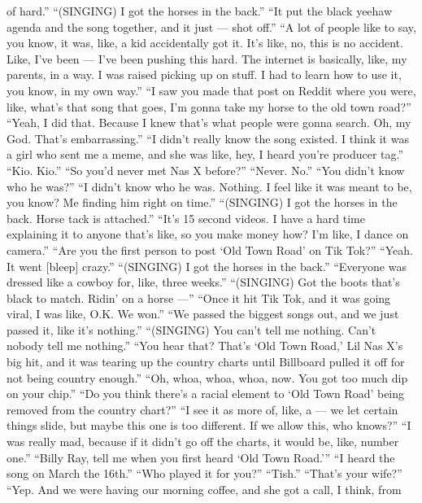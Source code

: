 \begin{itemize}
  of hard.'' ``(SINGING) I got the horses in the back.'' ``It put the
  black yeehaw agenda and the song together, and it just --- shot off.''
  ``A lot of people like to say, you know, it was, like, a kid
  accidentally got it. It's like, no, this is no accident. Like, I've
  been --- I've been pushing this hard. The internet is basically, like,
  my parents, in a way. I was raised picking up on stuff. I had to learn
  how to use it, you know, in my own way.'' ``I saw you made that post
  on Reddit where you were, like, what's that song that goes, I'm gonna
  take my horse to the old town road?'' ``Yeah, I did that. Because I
  knew that's what people were gonna search. Oh, my God. That's
  embarrassing.'' ``I didn't really know the song existed. I think it
  was a girl who sent me a meme, and she was like, hey, I heard you're
  producer tag.'' ``Kio. Kio.'' ``So you'd never met Nas X before?''
  ``Never. No.'' ``You didn't know who he was?'' ``I didn't know who he
  was. Nothing. I feel like it was meant to be, you know? Me finding him
  right on time.'' ``(SINGING) I got the horses in the back. Horse tack
  is attached.'' ``It's 15 second videos. I have a hard time explaining
  it to anyone that's like, so you make money how? I'm like, I dance on
  camera.'' ``Are you the first person to post `Old Town Road' on Tik
  Tok?'' ``Yeah. It went {[}bleep{]} crazy.'' ``(SINGING) I got the
  horses in the back.'' ``Everyone was dressed like a cowboy for, like,
  three weeks.'' ``(SINGING) Got the boots that's black to match. Ridin'
  on a horse ---'' ``Once it hit Tik Tok, and it was going viral, I was
  like, O.K. We won.'' ``We passed the biggest songs out, and we just
  passed it, like it's nothing.'' ``(SINGING) You can't tell me nothing.
  Can't nobody tell me nothing.'' ``You hear that? That's `Old Town
  Road,' Lil Nas X's big hit, and it was tearing up the country charts
  until Billboard pulled it off for not being country enough.'' ``Oh,
  whoa, whoa, whoa, now. You got too much dip on your chip.'' ``Do you
  think there's a racial element to `Old Town Road' being removed from
  the country chart?'' ``I see it as more of, like, a --- we let certain
  things slide, but maybe this one is too different. If we allow this,
  who knows?'' ``I was really mad, because if it didn't go off the
  charts, it would be, like, number one.'' ``Billy Ray, tell me when you
  first heard `Old Town Road.''' ``I heard the song on March the 16th.''
  ``Who played it for you?'' ``Tish.'' ``That's your wife?'' ``Yep. And
  we were having our morning coffee, and she got a call, I think, from

\end{itemize}
